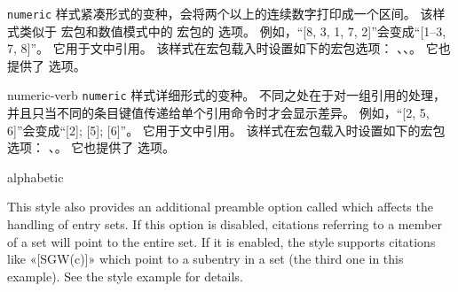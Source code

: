 \begin{marglist}
\texttt{numeric} 样式紧凑形式的变种，会将两个以上的连续数字打印成一个区间。
该样式类似于  宏包和数值模式中的  宏包的  选项。
例如，“[8, 3, 1, 7, 2]”会变成“[1--3, 7, 8]”。
它用于文中引用。
该样式在宏包载入时设置如下的宏包选项：
、、。
它也提供了  选项。

\item[numeric-verb]
\texttt{numeric} 样式详细形式的变种。
不同之处在于对一组引用的处理，
并且只当不同的条目键值传递给单个引用命令时才会显示差异。
例如，“[2, 5, 6]”会变成“[2]; [5]; [6]”。
它用于文中引用。
该样式在宏包载入时设置如下的宏包选项：
、。
它也提供了  选项。

\item[alphabetic]

This style also provides an additional preamble option called  which affects the handling of entry sets. If this option is disabled, citations referring to a member of a set will point to the entire set. If it is enabled, the style supports citations like «[SGW(c)]» which point to a subentry in a set (the third one in this example). See the style example for details.


\end{marglist}
